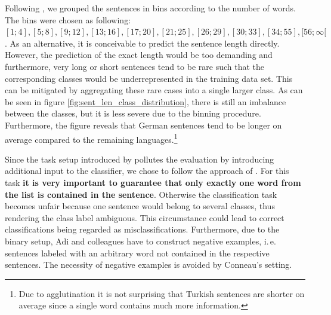  Following \citep{Adi.2017}, we grouped the sentences in bins according to the number of words. The bins were chosen as following: $[1;4], [5;8], [9;12], [13;16], [17;20], [21;25], [26;29], [30;33], [34;55], [56;\infty[$. As an alternative, it is conceivable to predict the sentence length directly. However, the prediction of the exact length would be too demanding and furthermore, very long or short sentences tend to be rare such that the corresponding classes would be underrepresented in the training data set. This can be mitigated by aggregating these rare cases into a single larger class. As can be seen in figure \vref{fig:sent_len_class_distribution}, there is still an imbalance between the classes, but it is less severe due to the binning procedure. Furthermore, the figure reveals that German sentences tend to be longer on average compared to the remaining languages.\footnote{Due to agglutination it is not surprising that Turkish sentences are shorter on average since a single word contains much more information.}





 Since the task setup introduced by \citep{Adi.2017} pollutes the evaluation by introducing additional input to the classifier, we chose to follow the approach of \citep{Conneau.2018a}. For this task \textbf{it is very important to guarantee that only exactly one word from the list is contained in the sentence}. Otherwise the classification task becomes unfair because one sentence would belong to several classes, thus rendering the class label ambiguous. This circumstance could lead to correct classifications being regarded as misclassifications. Furthermore, due to the binary setup, Adi and colleagues have to construct negative examples, i.\,e. sentences labeled with an arbitrary word not contained in the respective sentences. The necessity of negative examples is avoided by Conneau's setting.

